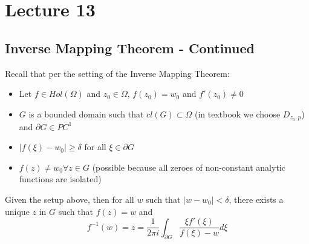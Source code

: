 \section{Lecture 13}

\subsection{Inverse Mapping Theorem - Continued}

Recall that per the setting of the Inverse Mapping Theorem:
\begin{itemize}
    \item Let $f \in Hol(\Omega)$ and $z_0 \in \Omega$, $f(z_0) = w_0$ and $f'(z_0) \neq 0$
    \item $G$ is a bounded domain such that $cl(G) \subset \Omega$ (in textbook we choose $D_{z_0, p}$) and $\partial G \in PC^1$
    \item $|f(\xi) - w_0| \geq \delta$ for all $\xi \in \partial G$
    \item $f(z) \neq w_0 \forall z \in G$ (possible because all zeroes of non-constant analytic functions are isolated)
\end{itemize}

\begin{theorem}
Given the setup above, then for all $w$ such that $|w - w_0| < \delta$, there exists a unique $z$ in $G$ such that $f(z) = w$ and
\[f^{-1}(w) = z = \frac{1}{2\pi i} \int_{\partial G} \frac{\xi f'(\xi)}{f(\xi) - w} d\xi\]
\end{theorem}

